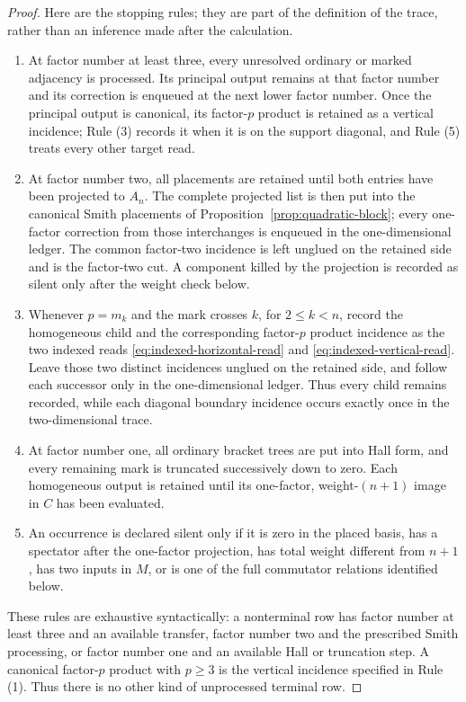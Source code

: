 \documentclass[11pt]{amsart}
\theoremstyle{remark}
\begin{document}
\begin{proof}
	Here are the stopping rules; they are part of the definition of the
	trace, rather than an inference made after the calculation.
	\begin{enumerate}
	\item At factor number at least three, every unresolved ordinary or
	marked adjacency is processed.  Its principal output remains at that
	factor number and its correction is enqueued at the next lower factor
	number.  Once the principal output is canonical, its factor-$p$ product
	is retained as a vertical incidence; Rule (3) records it when it is on
	the support diagonal, and Rule (5) treats every other target read.
	\item At factor number two, all placements are retained until both
	entries have been projected to $A_n$.  The complete projected list is
	then put into the canonical Smith placements of
	Proposition~\ref{prop:quadratic-block}; every one-factor correction from
	those interchanges is enqueued in the one-dimensional ledger.  The
	common factor-two incidence is left unglued on the retained side and is
	the factor-two cut.  A component killed by the
	projection is recorded as silent only after the weight check below.
	\item Whenever $p=m_k$ and the mark crosses $k$, for
	$2\leq k<n$, record the homogeneous child and the corresponding
	factor-$p$ product incidence as the two indexed reads
	\eqref{eq:indexed-horizontal-read} and
	\eqref{eq:indexed-vertical-read}.  Leave those two distinct incidences
	unglued on the retained side, and follow each successor only in the
	one-dimensional ledger.  Thus every child remains recorded, while each
	diagonal boundary incidence occurs exactly once in the two-dimensional
	trace.
	\item At factor number one, all ordinary bracket trees are put into Hall
	form, and every remaining mark is truncated successively down to zero.
	Each homogeneous output is retained until its one-factor,
	weight-$(n+1)$ image in $C$ has been evaluated.
	\item An occurrence is declared silent only if it is zero in the placed
	basis, has a spectator after the one-factor projection, has total weight
	different from $n+1$, has two inputs in $M$, or is one of the full
	commutator relations identified below.
	\end{enumerate}
	These rules are exhaustive syntactically: a nonterminal row has factor
	number at least three and an available transfer, factor number two and
	the prescribed Smith processing, or factor number one and an available
	Hall or truncation step.  A canonical factor-$p$ product with $p\geq3$
	is the vertical incidence specified in Rule (1).  Thus there is no other
	kind of unprocessed terminal row.


\end{proof}
\end{document}
